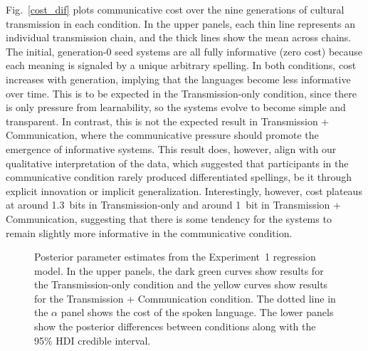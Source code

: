 \documentclass[doc,biblatex]{apa7}
\begin{document}
Fig.~\ref{cost_dif} plots communicative cost over the nine generations of cultural transmission in each condition. In the upper panels, each thin line represents an individual transmission chain, and the thick lines show the mean across chains. The initial, generation-0 seed systems are all fully informative (zero cost) because each meaning is signaled by a unique arbitrary spelling. In both conditions, cost increases with generation, implying that the languages become less informative over time. This is to be expected in the Transmission-only condition, since there is only pressure from learnability, so the systems evolve to become simple and transparent. In contrast, this is not the expected result in Transmission + Communication, where the communicative pressure should promote the emergence of informative systems. This result does, however, align with our qualitative interpretation of the data, which suggested that participants in the communicative condition rarely produced differentiated spellings, be it through explicit innovation or implicit generalization. Interestingly, however, cost plateaus at around 1.3~bits in Transmission-only and around 1~bit in Transmission + Communication, suggesting that there is some tendency for the systems to remain slightly more informative in the communicative condition.

	\begin{figure}
	\vspace*{2pt}
	\caption{Posterior parameter estimates from the Experiment~1 regression model. In the upper panels, the dark green curves show results for the Transmission-only condition and the yellow curves show results for the Transmission + Communication condition. The dotted line in the $\alpha$ panel shows the cost of the spoken language. The lower panels show the posterior differences between conditions along with the 95\% HDI credible interval.}
	\label{posterior_dif}
	\end{figure}
\end{document}
